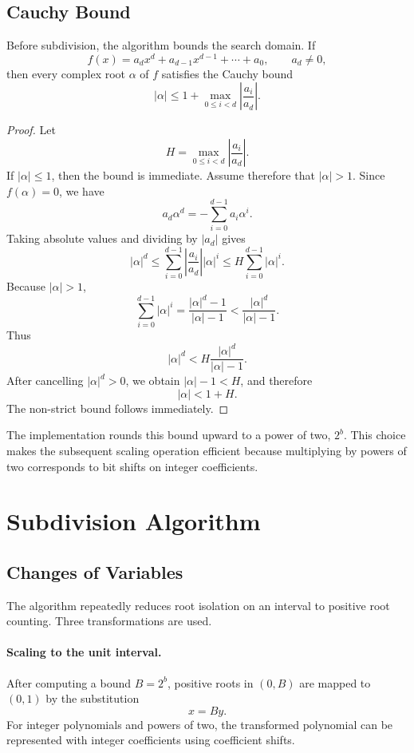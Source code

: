 \documentclass[letterpaper]{article}
\begin{document}
\subsection{Cauchy Bound}

Before subdivision, the algorithm bounds the search domain. If
\[
  f(x)=a_d x^d + a_{d-1}x^{d-1} + \cdots + a_0,
  \qquad a_d \neq 0,
\]
then every complex root $\alpha$ of $f$ satisfies the Cauchy bound
\[
  |\alpha| \leq 1 + \max_{0 \leq i < d} \left|\frac{a_i}{a_d}\right|.
\]

\begin{proof}
Let
\[
  H=\max_{0\leq i<d}\left|\frac{a_i}{a_d}\right|.
\]
If $|\alpha|\leq 1$, then the bound is immediate. Assume therefore that
$|\alpha|>1$. Since $f(\alpha)=0$, we have
\[
  a_d\alpha^d=-\sum_{i=0}^{d-1}a_i\alpha^i.
\]
Taking absolute values and dividing by $|a_d|$ gives
\[
  |\alpha|^d
  \leq
  \sum_{i=0}^{d-1}\left|\frac{a_i}{a_d}\right||\alpha|^i
  \leq
  H\sum_{i=0}^{d-1}|\alpha|^i.
\]
Because $|\alpha|>1$,
\[
  \sum_{i=0}^{d-1}|\alpha|^i
  =
  \frac{|\alpha|^d-1}{|\alpha|-1}
  <
  \frac{|\alpha|^d}{|\alpha|-1}.
\]
Thus
\[
  |\alpha|^d
  <
  H\frac{|\alpha|^d}{|\alpha|-1}.
\]
After cancelling $|\alpha|^d>0$, we obtain $|\alpha|-1<H$, and therefore
\[
  |\alpha|<1+H.
\]
The non-strict bound follows immediately.
\end{proof}

The implementation rounds this bound upward to a power of two, $2^b$. This
choice makes the subsequent scaling operation efficient because multiplying by
powers of two corresponds to bit shifts on integer coefficients.

\section{Subdivision Algorithm}

\subsection{Changes of Variables}

The algorithm repeatedly reduces root isolation on an interval to positive
root counting. Three transformations are used.

\paragraph{Scaling to the unit interval.}
After computing a bound $B=2^b$, positive roots in $(0,B)$ are mapped to
$(0,1)$ by the substitution
\[
  x = B y.
\]
For integer polynomials and powers of two, the transformed polynomial can be
represented with integer coefficients using coefficient shifts.
\end{document}

